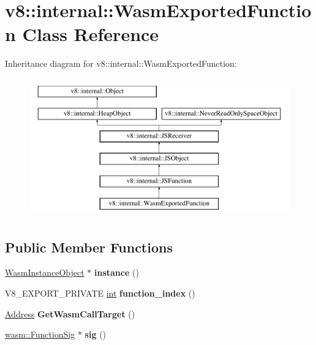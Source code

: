 \hypertarget{classv8_1_1internal_1_1WasmExportedFunction}{}\section{v8\+:\+:internal\+:\+:Wasm\+Exported\+Function Class Reference}
\label{classv8_1_1internal_1_1WasmExportedFunction}
Inheritance diagram for v8\+:\+:internal\+:\+:Wasm\+Exported\+Function\+:\begin{figure}[H]
\begin{center}
\leavevmode
\includegraphics[height=6.000000cm]{classv8_1_1internal_1_1WasmExportedFunction}
\end{center}
\end{figure}
\subsection*{Public Member Functions}
\begin{DoxyCompactItemize}
\item 
\mbox{\label{classv8_1_1internal_1_1WasmExportedFunction_aa6e055b6d12155cea191fa273922998f}} 
\mbox{\hyperlink{classv8_1_1internal_1_1WasmInstanceObject}{Wasm\+Instance\+Object}} $\ast$ {\bfseries instance} ()
\item 
\mbox{\label{classv8_1_1internal_1_1WasmExportedFunction_af203becc078aa9ca66804dca4f8709ad}} 
V8\+\_\+\+E\+X\+P\+O\+R\+T\+\_\+\+P\+R\+I\+V\+A\+TE \mbox{\hyperlink{classint}{int}} {\bfseries function\+\_\+index} ()
\item 
\mbox{\label{classv8_1_1internal_1_1WasmExportedFunction_a82e0a9dc51f1ed85b74580bb74b47101}} 
\mbox{\hyperlink{classuintptr__t}{Address}} {\bfseries Get\+Wasm\+Call\+Target} ()
\item 
\mbox{\label{classv8_1_1internal_1_1WasmExportedFunction_ae2a67da30f160a4178e91791c914a113}} 
\mbox{\hyperlink{classv8_1_1internal_1_1Signature}{wasm\+::\+Function\+Sig}} $\ast$ {\bfseries sig} ()
\end{DoxyCompactItemize}
